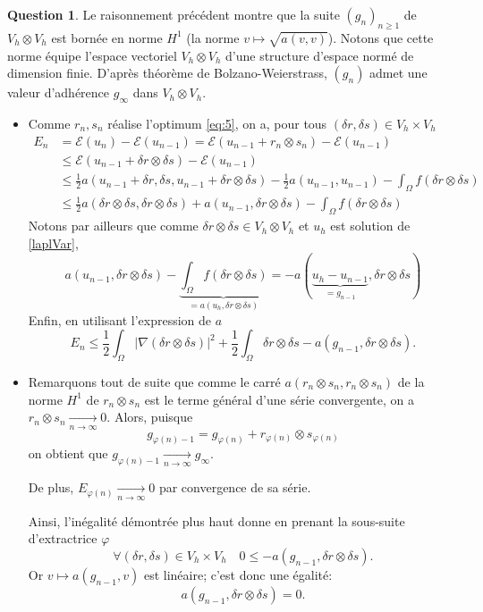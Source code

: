 \documentclass[11pt]{article}
\theoremstyle{definition}
\newtheorem{ques}{Question}
\begin{document}
\begin{ques}
Le raisonnement précédent montre que la suite $(g_n)_{n\geq 1}$ de $V_h\otimes V_h$ est bornée en norme $H^1$ (la norme $v\longmapsto \sqrt{a(v,v)}$). Notons que cette norme équipe l'espace vectoriel $V_h\otimes V_h$ d'une structure d'espace normé de dimension finie. D'après théorème de Bolzano-Weierstrass, $(g_n)$ admet une valeur d'adhérence $g_\infty$ dans $V_h\otimes V_h$.


\begin{itemize}
\item Comme $r_n,s_n$ réalise l'optimum \eqref{eq:5}, on a, pour tous $(\delta r,\delta s)\in V_h\times V_h$
\begin{align*}
E_n &= 
\mathcal{E}(u_n) - \mathcal{E}(u_{n-1}) = \mathcal{E}(u_{n-1}+r_n\otimes s_n) - \mathcal{E}(u_{n-1}) \\
&\leq \mathcal E(u_{n-1} +\delta r\otimes\delta s) - \mathcal E(u_{n-1}) \\
&\leq \frac 12a(u_{n-1}+\delta r,\delta s,u_{n-1} + \delta r\otimes \delta s) - \frac 12a(u_{n-1},u_{n-1}) - \int_\Omega f(\delta r\otimes\delta s) \\
&\leq \frac 12a(\delta r\otimes\delta s,\delta r\otimes\delta s) + a(u_{n-1},\delta r\otimes\delta s) - \int_\Omega f(\delta r\otimes\delta s)
\end{align*}
Notons par ailleurs que comme $\delta r\otimes\delta s\in V_h\otimes V_h$ et $u_h$ est solution de \eqref{laplVar},
\[
a(u_{n-1},\delta r\otimes\delta s) - \underbrace{\int_\Omega f(\delta r\otimes\delta s)}_{= a(u_h,\delta r\otimes\delta s)}= -a(\underbrace{u_h-u_{n-1}}_{=g_{n-1}},\delta r\otimes\delta s)
\]
Enfin, en utilisant l'expression de $a$
\[
\boxed{E_n \leq \frac12 \int_\Omega |\nabla(\delta r\otimes\delta s)|^2 + \frac 12\int_\Omega \delta r\otimes\delta s - a(g_{n-1},\delta r\otimes\delta s).}
\]

\item Remarquons tout de suite que comme le carré $a(r_n\otimes s_n,r_n\otimes s_n)$ de la norme $H^1$ de $r_n\otimes s_n$ est le terme général d'une série convergente, on a $r_n\otimes s_n\xrightarrow[n\to\infty]{}0$. Alors, puisque
\[
g_{\varphi(n)-1} = g_{\varphi(n)} + r_{\varphi(n)}\otimes s_{\varphi(n)}
\]
on obtient que $g_{\varphi(n)-1}\xrightarrow[n\to\infty]{}g_\infty$.

De plus, $E_{\varphi(n)}\xrightarrow[n\to\infty]{}0$ par convergence de sa série.

Ainsi, l'inégalité démontrée plus haut donne en prenant la sous-suite d'extractrice $\varphi$
\[
\forall (\delta r,\delta s)\in V_h\times V_h\quad
0\leq -a(g_{n-1},\delta r\otimes\delta s).
\]
Or $v\longmapsto a(g_{n-1},v)$ est linéaire; c'est donc une égalité:
\[
a(g_{n-1},\delta r\otimes\delta s) = 0.
\]


\end{itemize}
\end{ques}
\end{document}
